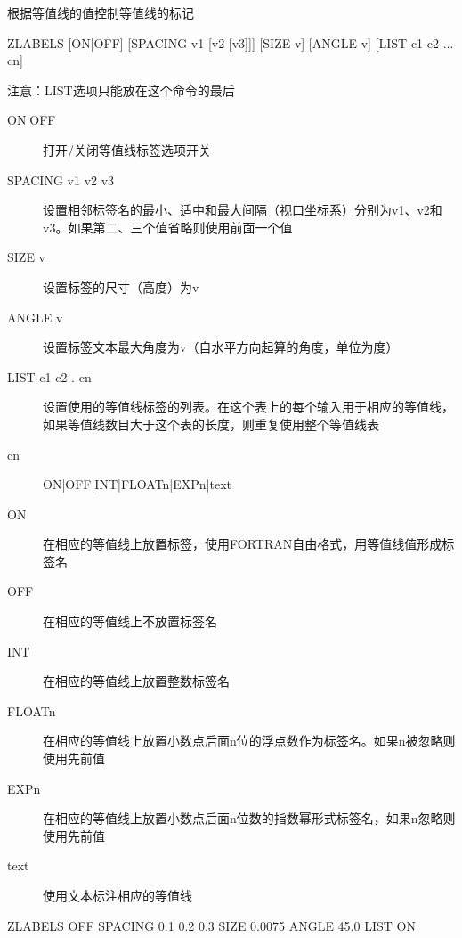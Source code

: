 \label{cmd:zlabels}

根据等值线的值控制等值线的标记

\begin{SACSTX}
ZLABELS [ON|OFF] [SPACING v1 [v2 [v3]]] [SIZE v] [ANGLE v] [LIST c1 c2 ... cn]
\end{SACSTX}
注意：LIST选项只能放在这个命令的最后

\begin{description}
\item [ON|OFF] 打开/关闭等值线标签选项开关 
\item [SPACING v1 v2 v3] 设置相邻标签名的最小、适中和最大间隔（视口坐标系）分别为v1、v2和v3。如果第二、三个值省略则使用前面一个值 
\item [SIZE v] 设置标签的尺寸（高度）为v 
\item [ANGLE v] 设置标签文本最大角度为v（自水平方向起算的角度，单位为度） 
\item [LIST c1 c2 . cn] 设置使用的等值线标签的列表。在这个表上的每个输入用于相应的等值线，如果等值线数目大于这个表的长度，则重复使用整个等值线表 
\item [cn]  ON|OFF|INT|FLOATn|EXPn|text 
\item [ON] 在相应的等值线上放置标签，使用FORTRAN自由格式，用等值线值形成标签名 
\item [OFF] 在相应的等值线上不放置标签名 
\item [INT] 在相应的等值线上放置整数标签名 
\item [FLOATn] 在相应的等值线上放置小数点后面n位的浮点数作为标签名。如果n被忽略则使用先前值 
\item [EXPn] 在相应的等值线上放置小数点后面n位数的指数幂形式标签名，如果n忽略则使用先前值 
\item [text] 使用文本标注相应的等值线 
\end{description}

\begin{SACDFT}
ZLABELS  OFF  SPACING 0.1 0.2 0.3  SIZE  0.0075 ANGLE 45.0  LIST ON
\end{SACDFT}

